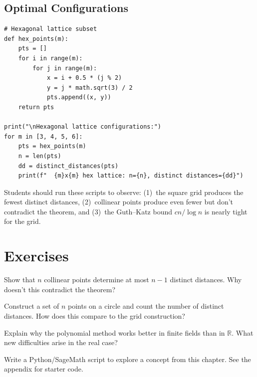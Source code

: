 \subsection{Optimal Configurations}

\begin{verbatim}
# Hexagonal lattice subset
def hex_points(m):
    pts = []
    for i in range(m):
        for j in range(m):
            x = i + 0.5 * (j % 2)
            y = j * math.sqrt(3) / 2
            pts.append((x, y))
    return pts

print("\nHexagonal lattice configurations:")
for m in [3, 4, 5, 6]:
    pts = hex_points(m)
    n = len(pts)
    dd = distinct_distances(pts)
    print(f"  {m}x{m} hex lattice: n={n}, distinct distances={dd}")
\end{verbatim}

\begin{highlightbox}
Students should run these scripts to observe: (1)~the square grid produces the fewest distinct distances, (2)~collinear points produce even fewer but don't contradict the theorem, and (3)~the Guth--Katz bound $cn/\log n$ is nearly tight for the grid.
\end{highlightbox}

\section{Exercises}

\begin{exercise}[Basic]
Show that $n$ collinear points determine at most $n-1$ distinct distances. Why doesn't this contradict the theorem?
\end{exercise}

\begin{exercise}[Intermediate]
Construct a set of $n$ points on a circle and count the number of distinct distances. How does this compare to the grid construction?
\end{exercise}

\begin{exercise}[Challenge]
Explain why the polynomial method works better in finite fields than in $\mathbb{R}$. What new difficulties arise in the real case?
\end{exercise}


\begin{exercise}[Computational]
Write a Python/SageMath script to explore a concept from this chapter. See the appendix for starter code.
\end{exercise}

